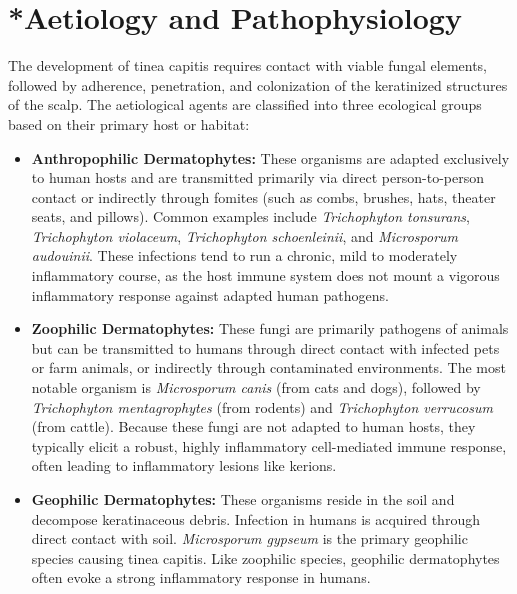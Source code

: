 \section{*Aetiology and Pathophysiology}
The development of tinea capitis requires contact with viable fungal elements, followed by adherence, penetration, and colonization of the keratinized structures of the scalp. The aetiological agents are classified into three ecological groups based on their primary host or habitat:
\begin{itemize}
    \item \textbf{Anthropophilic Dermatophytes:} These organisms are adapted exclusively to human hosts and are transmitted primarily via direct person-to-person contact or indirectly through fomites (such as combs, brushes, hats, theater seats, and pillows). Common examples include \textit{Trichophyton tonsurans}, \textit{Trichophyton violaceum}, \textit{Trichophyton schoenleinii}, and \textit{Microsporum audouinii}. These infections tend to run a chronic, mild to moderately inflammatory course, as the host immune system does not mount a vigorous inflammatory response against adapted human pathogens.
    \item \textbf{Zoophilic Dermatophytes:} These fungi are primarily pathogens of animals but can be transmitted to humans through direct contact with infected pets or farm animals, or indirectly through contaminated environments. The most notable organism is \textit{Microsporum canis} (from cats and dogs), followed by \textit{Trichophyton mentagrophytes} (from rodents) and \textit{Trichophyton verrucosum} (from cattle). Because these fungi are not adapted to human hosts, they typically elicit a robust, highly inflammatory cell-mediated immune response, often leading to inflammatory lesions like kerions.
    \item \textbf{Geophilic Dermatophytes:} These organisms reside in the soil and decompose keratinaceous debris. Infection in humans is acquired through direct contact with soil. \textit{Microsporum gypseum} is the primary geophilic species causing tinea capitis. Like zoophilic species, geophilic dermatophytes often evoke a strong inflammatory response in humans.
\end{itemize}

